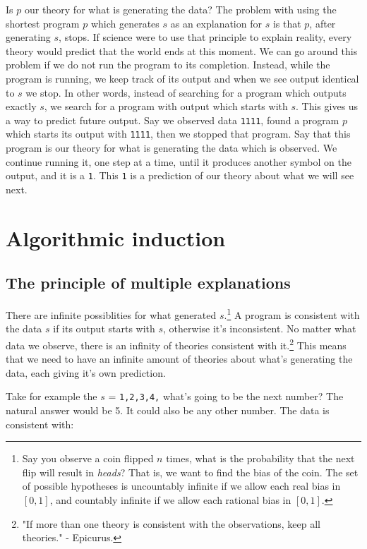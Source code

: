\documentclass[oneside,hidelinks]{article}
\begin{document}
Is $p$ our theory for what is generating the data?
The problem with using the shortest program $p$ which generates $s$ as an explanation for $s$ is that $p$, after generating $s$, stops.
If science were to use that principle to explain reality, every theory would predict that the world ends at this moment.
We can go around this problem if we do not run the program to its completion.
Instead, while the program is running, we keep track of its output and when we see output identical to $s$ we stop.
In other words, instead of searching for a program which outputs exactly $s$, we search for a program with output which starts with $s$.
This gives us a way to predict future output.
Say we observed data \texttt{1111}, found a program $p$ which starts its output with \texttt{1111}, then we stopped that program.
Say that this program is our theory for what is generating the data which is observed.
We continue running it, one step at a time, until it produces another symbol on the output, and it is a \texttt{1}.
This \texttt{1} is a prediction of our theory about what we will see next.

\newpage

\section{Algorithmic induction}

\subsection{The principle of multiple explanations}

There are infinite possiblities for what generated $s$.\footnote{
Say you observe a coin flipped $n$ times, what is the probability that the next flip will result in \textit{heads}?
That is, we want to find the bias of the coin.
The set of possible hypotheses is uncountably infinite if we allow each real bias in $[0, 1]$, and countably infinite if we allow each rational bias in $[0, 1]$.
}
A program is consistent with the data $s$ if its output starts with $s$, otherwise it's inconsistent.
No matter what data we observe, there is an infinity of theories consistent with it.\footnote{
"If more than one theory is consistent with the observations, keep all theories." - Epicurus.
}
This means that we need to have an infinite amount of theories about what's generating the data, each giving it's own prediction.

Take for example the $s$ = \texttt{1,2,3,4,} what's going to be the next number? The natural answer would be 5. It could also be any other number. The data is consistent with:
\end{document}
